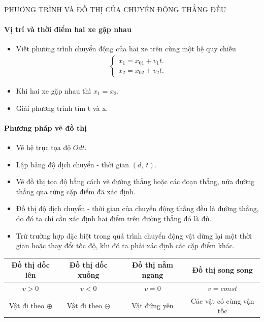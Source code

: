 \begin{dang}{PHƯƠNG TRÌNH VÀ ĐỒ THỊ CỦA CHUYỂN ĐỘNG THẲNG ĐỀU}
\setcounter{paragraph}{0}
\paragraph{Vị trí và thời điểm hai xe gặp nhau}
\begin{itemize}
\item Viết phương trình chuyển động của hai xe trên cùng một hệ quy chiếu
\begin{align*}\begin{cases}
x_1=x_{01}+v_1t.\\
x_2=x_{02}+v_2t.
\end{cases}
\end{align*}
\item Khi hai xe gặp nhau thì $x_1=x_2$.
\item Giải phương trình tìm t và x.
\end{itemize}
\paragraph{Phương pháp vẽ đồ thị}
\begin{itemize}
\item Vẽ hệ trục tọa độ $Odt$.
\item Lập bảng độ dịch chuyển - thời gian $(d,\ t)$. 
\item Vẽ đồ thị tọa độ bằng cách vẽ đường thẳng hoặc các đoạn thẳng, nửa đường thẳng qua từng cặp điểm đã xác định.
\end{itemize}
\begin{note}
\begin{itemize}
\item[$\bullet$] Đồ thị độ dịch chuyển - thời gian của chuyển động thẳng đều là đường thẳng, do đó ta chỉ cần xác định hai điểm trên đường thẳng đó là đủ.
\item[$\bullet$] Trừ trường hợp đặc biệt trong quá trình chuyển động vật dừng lại một thời gian hoặc thay đổi tốc độ, khi đó ta phải xác định các cặp điểm khác.
\end{itemize}
\end{note}
\begin{center}
\begin{tabular}{|c|c|c|c|}
\hline 
\textbf{Đồ thị dốc lên} & \textbf{Đồ thị dốc xuống} & \textbf{Đồ thị nằm ngang} & \textbf{Đồ thị song song}\\ 
\hline 
$v > 0$ & $v < 0$ & $v = 0$ & $v=const$\\ 
\hline 
Vật đi theo $\oplus$  & Vật đi theo $\circleddash$ & Vật đứng yên & Các vật có cùng vận tốc\\ 
\hline 
\end{tabular} 
\end{center}
\end{dang}
